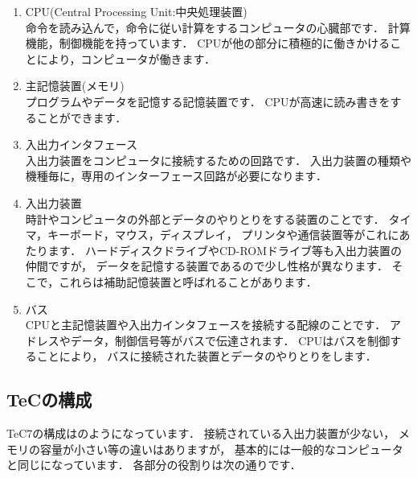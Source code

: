 \begin{enumerate}
\item CPU(Central Processing Unit:中央処理装置) \\
命令を読み込んで，命令に従い計算をするコンピュータの心臓部です．
計算機能，制御機能を持っています．
CPUが他の部分に積極的に働きかけることにより，コンピュータが働きます．
\item 主記憶装置(メモリ) \\
プログラムやデータを記憶する記憶装置です．
CPUが高速に読み書きをすることができます．
\item 入出力インタフェース \\
入出力装置をコンピュータに接続するための回路です．
入出力装置の種類や機種毎に，専用のインターフェース回路が必要になります．
\item 入出力装置 \\
時計やコンピュータの外部とデータのやりとりをする装置のことです．
タイマ，キーボード，マウス，ディスプレイ，
プリンタや通信装置等がこれにあたります．
ハードディスクドライブやCD-ROMドライブ等も入出力装置の仲間ですが，
データを記憶する装置であるので少し性格が異なります．
そこで，これらは補助記憶装置と呼ばれることがあります．
\item バス \\
CPUと主記憶装置や入出力インタフェースを接続する配線のことです．
アドレスやデータ，制御信号等がバスで伝達されます．
CPUはバスを制御することにより，
バスに接続された装置とデータのやりとりをします．
\end{enumerate}

\subsection{TeCの構成}


TeC7の構成はのようになっています．
接続されている入出力装置が少ない，
メモリの容量が小さい等の違いはありますが，
基本的には一般的なコンピュータと同じになっています．
各部分の役割りは次の通りです．

